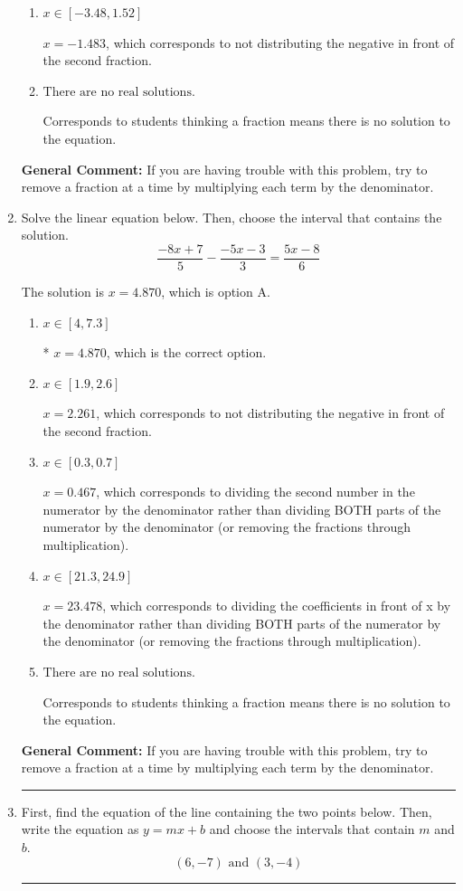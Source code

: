 \documentclass{extbook}[14pt]
\newcommand{\litem}[1]{\item #1

\rule{\textwidth}{0.4pt}}
\begin{document}
\begin{enumerate}
{\begin{enumerate}[label=\Alph*.]
* $x = -3.690$, which is the correct option.
\item \( x \in [-3.48, 1.52] \)

 $x = -1.483$, which corresponds to not distributing the negative in front of the second fraction.
\item \( \text{There are no real solutions.} \)

Corresponds to students thinking a fraction means there is no solution to the equation.
\end{enumerate}

\textbf{General Comment:} If you are having trouble with this problem, try to remove a fraction at a time by multiplying each term by the denominator.
}
\litem{
Solve the linear equation below. Then, choose the interval that contains the solution.
\[ \frac{-8x + 7}{5} - \frac{-5x -3}{3} = \frac{5x -8}{6} \]

The solution is \( x = 4.870 \), which is option A.\begin{enumerate}[label=\Alph*.]
\item \( x \in [4, 7.3] \)

* $x = 4.870$, which is the correct option.
\item \( x \in [1.9, 2.6] \)

 $x = 2.261$, which corresponds to not distributing the negative in front of the second fraction.
\item \( x \in [0.3, 0.7] \)

 $x = 0.467$, which corresponds to dividing the second number in the numerator by the denominator rather than dividing BOTH parts of the numerator by the denominator (or removing the fractions through multiplication).
\item \( x \in [21.3, 24.9] \)

 $x = 23.478$, which corresponds to dividing the coefficients in front of x by the denominator rather than dividing BOTH parts of the numerator by the denominator (or removing the fractions through multiplication).
\item \( \text{There are no real solutions.} \)

Corresponds to students thinking a fraction means there is no solution to the equation.
\end{enumerate}

\textbf{General Comment:} If you are having trouble with this problem, try to remove a fraction at a time by multiplying each term by the denominator.
}
\litem{
First, find the equation of the line containing the two points below. Then, write the equation as $ y=mx+b $ and choose the intervals that contain $m$ and $b$.
\[ (6, -7) \text{ and } (3, -4) \]

}
\end{enumerate}
\end{document}
